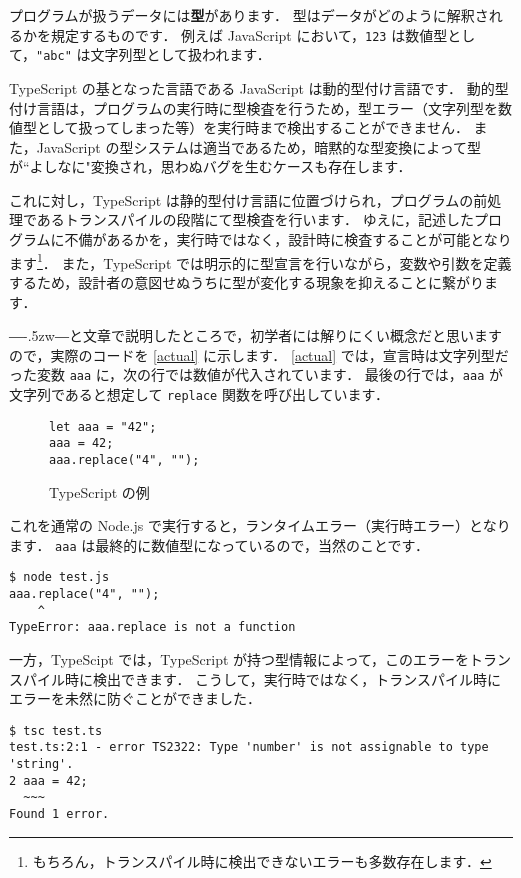 \documentclass[a4j, 11pt]{jarticle}
\begin{document}
プログラムが扱うデータには\textbf{型}があります．
型はデータがどのように解釈されるかを規定するものです．
例えば JavaScript において，\verb|123| は数値型として，\verb|"abc"| は文字列型として扱われます．

TypeScript の基となった言語である JavaScript は動的型付け言語です．
動的型付け言語は，プログラムの実行時に型検査を行うため，型エラー（文字列型を数値型として扱ってしまった等）を実行時まで検出することができません．
また，JavaScript の型システムは適当であるため，暗黙的な型変換によって型が``よしなに"変換され，思わぬバグを生むケースも存在します．

これに対し，TypeScript は静的型付け言語に位置づけられ，プログラムの前処理であるトランスパイルの段階にて型検査を行います．
ゆえに，記述したプログラムに不備があるかを，実行時ではなく，設計時に検査することが可能となります\footnote{もちろん，トランスパイル時に検出できないエラーも多数存在します．}．
また，TypeScript では明示的に型宣言を行いながら，変数や引数を定義するため，設計者の意図せぬうちに型が変化する現象を抑えることに繋がります．

―\kern-.5zw―と文章で説明したところで，初学者には解りにくい概念だと思いますので，実際のコードを \autoref{actual} に示します．
\autoref{actual} では，宣言時は文字列型だった変数 \verb|aaa| に，次の行では数値が代入されています．
最後の行では，\verb|aaa| が文字列であると想定して \verb|replace| 関数を呼び出しています．

\begin{figure}[H]
\caption{TypeScript の例}
\label{actual}
\begin{lstlisting}
let aaa = "42";
aaa = 42;
aaa.replace("4", "");  
\end{lstlisting}
\end{figure}

これを通常の Node.js で実行すると，ランタイムエラー（実行時エラー）となります．
\verb|aaa| は最終的に数値型になっているので，当然のことです．

\begin{verbatim}
$ node test.js                
aaa.replace("4", "");
    ^
TypeError: aaa.replace is not a function
\end{verbatim}

一方，TypeScipt では，TypeScript が持つ型情報によって，このエラーをトランスパイル時に検出できます．
こうして，実行時ではなく，トランスパイル時にエラーを未然に防ぐことができました．

\begin{verbatim}
$ tsc test.ts
test.ts:2:1 - error TS2322: Type 'number' is not assignable to type 'string'.
2 aaa = 42;
  ~~~
Found 1 error.
\end{verbatim}
\end{document}
